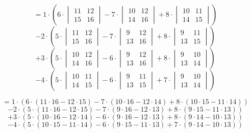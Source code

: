 \documentclass[12pt]{article}
\begin{document}
\begin{center}
$$
= 1 \cdot \left(
6 \cdot \begin{vmatrix} 11 & 12 \\ 15 & 16 \end{vmatrix}
- 7 \cdot \begin{vmatrix} 10 & 12 \\ 14 & 16 \end{vmatrix} 
+ 8 \cdot \begin{vmatrix} 10 & 11 \\ 14 & 15 \end{vmatrix} 
\right)
$$
$$
- 2 \cdot \left(
5 \cdot \begin{vmatrix} 11 & 12 \\ 15 & 16 \end{vmatrix}
- 7 \cdot \begin{vmatrix} 9 & 12 \\ 13 & 16 \end{vmatrix} 
+ 8 \cdot \begin{vmatrix} 9 & 11 \\ 13 & 15 \end{vmatrix} 
\right)
$$
$$
+ 3 \cdot \left(
5 \cdot \begin{vmatrix} 10 & 12 \\ 14 & 16 \end{vmatrix}
- 6 \cdot \begin{vmatrix} 9 & 12 \\ 13 & 16 \end{vmatrix} 
+ 8 \cdot \begin{vmatrix} 9 & 10 \\ 13 & 14 \end{vmatrix} 
\right)
$$
$$
- 4 \cdot \left(
5 \cdot \begin{vmatrix} 10 & 11 \\ 14 & 15 \end{vmatrix}
- 6 \cdot \begin{vmatrix} 9 & 11 \\ 13 & 15 \end{vmatrix} 
+ 7 \cdot \begin{vmatrix} 9 & 10 \\ 13 & 14 \end{vmatrix} 
\right)
$$

$$
= 1 \cdot (
6 \cdot (11\cdot16 - 12\cdot15)
- 7 \cdot (10\cdot16 - 12\cdot14)
+ 8 \cdot (10\cdot15 - 11\cdot14)
)
$$
$$
- 2 \cdot (
5 \cdot (11\cdot16 - 12\cdot15)
- 7 \cdot (9\cdot16 - 12\cdot13)
+ 8 \cdot (9\cdot15 - 11\cdot13)
)
$$
$$
+ 3 \cdot (
5 \cdot (10\cdot16 - 12\cdot14)
- 6 \cdot (9\cdot16 - 12\cdot13)
+ 8 \cdot (9\cdot14 - 10\cdot13)
)
$$
$$
- 4 \cdot (
5 \cdot (10\cdot15 - 11\cdot14)
- 6 \cdot (9\cdot15 - 11\cdot13)
+ 7 \cdot (9\cdot14 - 10\cdot13)
)
$$


\end{center}
\end{document}
